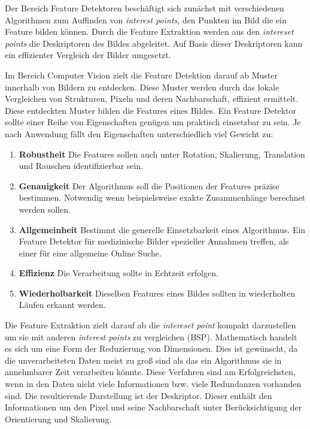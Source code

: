 Der Bereich Feature Detektoren beschäftigt sich zunächst mit verschiedenen Algorithmen zum Auffinden von \textit{interest points}, den Punkten im Bild die ein Feature bilden können. 
Durch die Feature Extraktion werden aus den \textit{intereset points} die Deskriptoren des Bildes abgeleitet. Auf Basis dieser Deskriptoren kann ein effizienter Vergleich der Bilder umgesetzt.

Im Bereich Computer Vision zielt die Feature Detektion darauf ab Muster innerhalb von Bildern zu entdecken. Diese Muster werden durch das lokale Vergleichen von Strukturen, Pixeln und deren Nachbarschaft, effizient ermittelt. Diese entdeckten Muster bilden die Features eines Bildes. Ein Feature Detektor sollte einer Reihe von Eigenschaften genügen um praktisch einsetzbar zu sein. Je nach Anwendung fällt den Eigenschaften unterschiedlich viel Gewicht zu:

\begin{enumerate}
	\item \textbf{Robustheit} Die Features sollen auch unter Rotation, Skalierung, Translation und Rauschen identifizierbar sein.
	\item \textbf{Genauigkeit} Der Algorithmus soll die Positionen der Features präzise bestimmen. Notwendig wenn beispielsweise exakte Zusammenhänge berechnet werden sollen.
	\item \textbf{Allgemeinheit} Bestimmt die generelle Einsetzbarkeit eines Algorithmus. Ein Feature Detektor für medizinische Bilder spezieller Annahmen treffen, als einer für eine allgemeine Online Suche.
	\item \textbf{Effizienz} Die Verarbeitung sollte in Echtzeit erfolgen.
	\item \textbf{Wiederholbarkeit} Dieselben Features eines Bildes sollten in wiederholten Läufen erkannt werden.
\end{enumerate}

Die Feature Extraktion zielt darauf ab die \textit{intereset point} kompakt darzustellen um sie mit anderen \textit{interest points} zu vergleichen (BSP). Mathematisch handelt es sich um eine Form der Reduzierung von Dimensionen. Dies ist gewünscht, da die unverarbeiteten Daten meist zu groß sind als das ein Algorithmus sie in annehmbarer Zeit verarbeiten könnte. Diese Verfahren sind am Erfolgreichsten, wenn in den Daten nicht viele Informationen bzw. viele Redundanzen vorhanden sind. Die resultierende Darstellung ist der Deskriptor. Dieser enthält den Informationen um den Pixel und seine Nachbarschaft unter Berücksichtigung der Orientierung und Skalierung.

